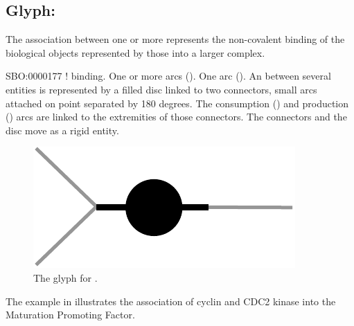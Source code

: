 

\subsection{Glyph: }\label{sec:association}

The association between one or more  represents the non-covalent binding of the biological objects represented by those  into a larger complex.

\begin{glyphDescription}
 \glyphSboTerm SBO:0000177 ! binding.
 \glyphOrigin One or more  arcs ().
 \glyphTarget  One  arc ().
 \glyphNode An  between several entities is represented by a filled disc linked to two connectors, small arcs attached on point separated by 180 degrees. The consumption () and production () arcs are linked to the extremities of those connectors. The connectors and the disc move as a rigid entity.
 \end{glyphDescription}

\begin{figure}[H]
  \centering
  \includegraphics[scale = 0.5]{images/association}
  \caption{The \PD glyph for .}
  \label{fig:association}
\end{figure}

The example in  illustrates the association of cyclin and CDC2 kinase into the Maturation Promoting Factor.

